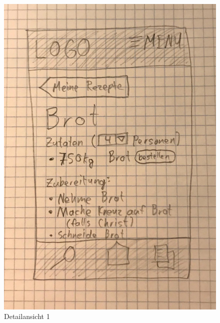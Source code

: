 \begin{figure}[H]
  \includegraphics[width=\linewidth]{./exercise13/Detailansicht1.jpeg}
  \caption{Detailansicht 1}
\end{figure}

